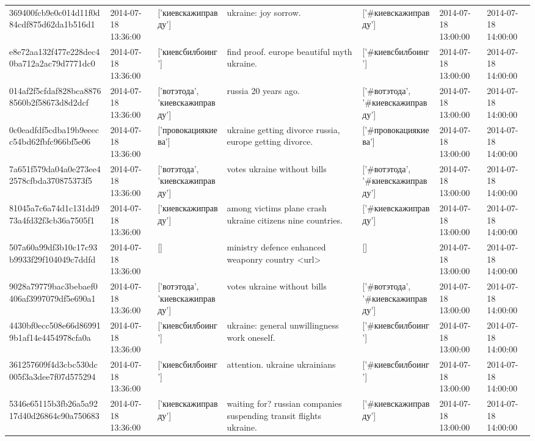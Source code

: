 \begin{tabular}{lllllll}
369400fcb9e0c014d11f0d84cdf875d62da1b516d1 & 2014-07-18 13:36:00 & ['киевскажиправду'] & ukraine: joy sorrow. & ['#киевскажиправду'] & 2014-07-18 13:00:00 & 2014-07-18 14:00:00 \\
e8e72aa132f477e228dec40ba712a2ac79d7771dc0 & 2014-07-18 13:36:00 & ['киевсбилбоинг'] & find proof. europe beautiful myth ukraine. & ['#киевсбилбоинг'] & 2014-07-18 13:00:00 & 2014-07-18 14:00:00 \\
014af2f5cfdaf828bca88768560b2f58673d8d2dcf & 2014-07-18 13:36:00 & ['вотэтода', 'киевскажиправду'] & russia 20 years ago. & ['#вотэтода', '#киевскажиправду'] & 2014-07-18 13:00:00 & 2014-07-18 14:00:00 \\
0c0eadfdf5cdba19b9eeecc54bd62fbfc966bf5e06 & 2014-07-18 13:36:00 & ['провокациякиева'] & ukraine getting divorce russia, europe getting divorce. & ['#провокациякиева'] & 2014-07-18 13:00:00 & 2014-07-18 14:00:00 \\
7a651f579da04a0e273ee42578cfbda370875373f5 & 2014-07-18 13:36:00 & ['вотэтода', 'киевскажиправду'] & votes ukraine without bills & ['#вотэтода', '#киевскажиправду'] & 2014-07-18 13:00:00 & 2014-07-18 14:00:00 \\
81045a7c6a74d1c131dd973a4fd32f3cb36a7505f1 & 2014-07-18 13:36:00 & ['киевскажиправду'] & among victims plane crash ukraine citizens nine countries. & ['#киевскажиправду'] & 2014-07-18 13:00:00 & 2014-07-18 14:00:00 \\
507a60a99df3b10c17c93b9933f29f104049c7ddfd & 2014-07-18 13:36:00 & [] & ministry defence enhanced weaponry country <url> & [] & 2014-07-18 13:00:00 & 2014-07-18 14:00:00 \\
9028a79779bac3bebaef0406af3997079df5e690a1 & 2014-07-18 13:36:00 & ['вотэтода', 'киевскажиправду'] & votes ukraine without bills & ['#вотэтода', '#киевскажиправду'] & 2014-07-18 13:00:00 & 2014-07-18 14:00:00 \\
4430bf0ecc508e66d869919b1af14e4454978cfa0a & 2014-07-18 13:36:00 & ['киевсбилбоинг'] & ukraine: general unwillingness work oneself. & ['#киевсбилбоинг'] & 2014-07-18 13:00:00 & 2014-07-18 14:00:00 \\
361257609f4d3cbc530dc005f3a3dee7f07d575294 & 2014-07-18 13:36:00 & ['киевсбилбоинг'] & attention. ukraine ukrainians & ['#киевсбилбоинг'] & 2014-07-18 13:00:00 & 2014-07-18 14:00:00 \\
5346e65115b3fb26a5a9217d40d26864c90a750683 & 2014-07-18 13:36:00 & ['киевскажиправду'] & waiting for? russian companies suspending transit flights ukraine. & ['#киевскажиправду'] & 2014-07-18 13:00:00 & 2014-07-18 14:00:00 \\

\end{tabular}
